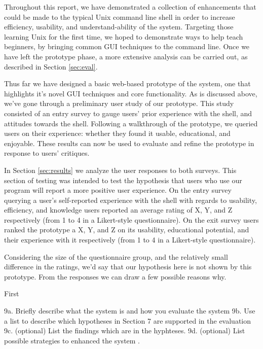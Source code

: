 Throughout this report, we have demonstrated a collection of enhancements that
could be made to the typical Unix command line shell in order to increase
efficiency, usability, and understand-ability of the system. Targeting those
learning Unix for the first time, we hoped to demonstrate ways to help teach
beginners, by bringing common GUI techniques to the command line. Once we have
left the prototype phase, a more extensive analysis can be carried out, as
described in Section \ref{sec:eval}.

Thus far we have designed a basic web-based prototype of the system, one that
highlights it's novel GUI techniques and core functionality. As is discussed
above, we've gone through a preliminary user study of our prototype. This study
consisted of an entry survey to gauge users' prior experience with the shell,
and attitudes towards the shell. Following a walkthrough of the prototype, we
queried users on their experience: whether they found it usable, educational,
and enjoyable. These results can now be used to evaluate and refine the
prototype in response to users' critiques.

In Section \ref{sec:results} we analyze the user responses to both surveys. This
section of testing was intended to test the hypothesis that users who use our
program will report a more positive user experience. On the entry survey
querying a user's self-reported experience with the shell with regards to
usability, efficiency, and knowledge users reported an average rating of X, Y,
and Z respectively (from 1 to 4 in a Likert-style questionnaire). On the exit
survey users ranked the prototype a X, Y, and Z on its usability, educational
potential, and their experience with it respectively (from 1 to 4 in a
Likert-style questionnaire).

Considering the size of the questionnaire group, and the relatively small
difference in the ratings, we'd say that our hypothesis here is not shown by
this prototype. From the responses we can draw a few possible reasons why.

First

9a. Briefly describe what the system is and how you evaluate the system
9b. Use a list to describe which hypotheses in Section 7 are supported in the evaluation
9c. (optional) List the findings which are in the hyphteses.
9d. (optional) List possible strategies to enhanced the system
.
